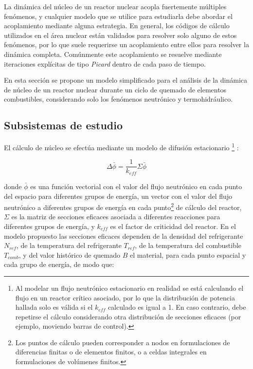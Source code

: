 La dinámica del núcleo de un reactor nuclear acopla fuertemente múltiples fenómenos, y cualquier modelo que se utilice para estudiarla debe abordar el acoplamiento mediante alguna estrategia.
En general, los códigos de cálculo utilizados en el área nuclear están validados para resolver solo alguno de estos fenómenos,
por lo que suele requerirse un acoplamiento entre ellos para resolver la dinámica completa.
Comúnmente este acoplamiento se resuelve mediante iteraciones explícitas de tipo \textit{Picard} dentro de cada paso de tiempo.

En esta sección se propone un modelo simplificado para el análisis de la dinámica de núcleo de un reactor nuclear durante un ciclo de quemado de elementos combustibles,
considerando solo los fenómenos neutrónico y termohidráulico.

\subsection*{Subsistemas de estudio}
\label{3:subsistemas-nt}

El cálculo de núcleo se efectúa mediante un modelo de difusión estacionario
\footnote{Al modelar un flujo neutrónico estacionario en realidad se está calculando el flujo en un reactor crítico asociado,
por lo que la distribución de potencia hallada solo es válida si el $k_{eff}$ calculado es igual a 1.
En caso contrario, debe repetirse el cálculo considerando otra distribución de secciones eficaces
(por ejemplo, moviendo barras de control).
} \cite{henry}:

\begin{equation}
\Delta \bar{\phi} = \frac{1}{k_{eff}}\Sigma \bar{\phi}
\label{eq-nucleo}
\end{equation}

donde $\bar{\phi}$ es una función vectorial con el valor del flujo neutrónico en cada punto del espacio para diferentes grupos de energía,
un vector con el valor del flujo neutrónico a diferentes grupos de energía en cada punto\footnote{
Los puntos de cálculo pueden corresponder a nodos en formulaciones de diferencias finitas o de elementos finitos, o a celdas integrales en formulaciones de volúmenes finitos.	
} de cálculo del reactor,
$\Sigma$ es la matriz de secciones eficaces asociada a diferentes reacciones para diferentes grupos de energía,
y $k_{eff}$ es el factor de criticidad del reactor.
En el modelo propuesto las secciones eficaces dependen de la densidad del refrigerante $N_{ref}$, de la temperatura del refrigerante $T_{ref}$, de la temperatura del combustible $T_{comb}$, 
y del valor histórico de quemado $B$ el material\cite{lamarsh},
para cada punto espacial y cada grupo de energía, de modo que:

